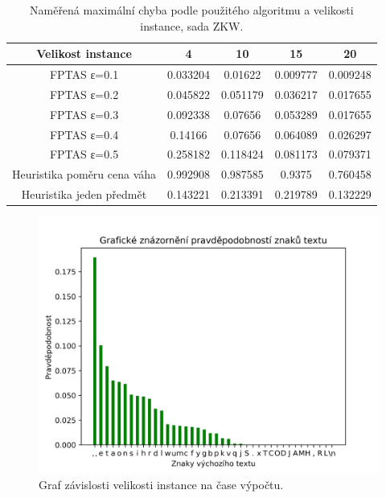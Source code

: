 \documentclass[12pt]{article}
\begin{document}
\begin{table}[h!]
\centering
\begin{tabular}{ | c | | c | c | c | c | }\hline
Velikost instance & 4 & 10 & 15 & 20 \\ \hline \hline
FPTAS ε=0.1 & 0.033204 & 0.01622 & 0.009777 & 0.009248  \\ \hline
FPTAS ε=0.2 & 0.045822 & 0.051179 & 0.036217 & 0.017655  \\ \hline
FPTAS ε=0.3 & 0.092338 & 0.07656 & 0.053289 & 0.017655  \\ \hline
FPTAS ε=0.4 & 0.14166 & 0.07656 & 0.064089 & 0.026297  \\ \hline
FPTAS ε=0.5 & 0.258182 & 0.118424 & 0.081173 & 0.079371  \\ \hline
Heuristika poměru cena váha & 0.992908 & 0.987585 & 0.9375 & 0.760458  \\ \hline
Heuristika jeden předmět & 0.143221 & 0.213391 & 0.219789 & 0.132229  \\ \hline
\end{tabular}
\caption{Naměřená maximální chyba podle použitého algoritmu a velikosti instance, sada  ZKW.}
\label{ZKW_error_table}
\end{table}

\begin{figure}[!htb]
\includegraphics[scale=0.7]{../009_char_prob.png}\centering\caption{Graf závislosti velikosti instance na čase výpočtu.}\label{ZKC_graph}
\end{figure}
\end{document}

